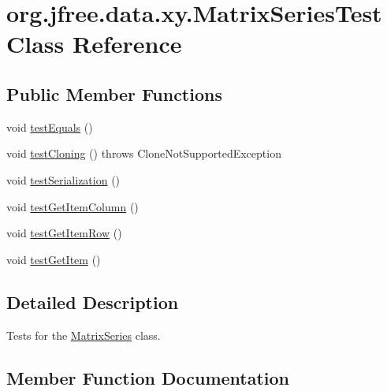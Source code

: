 \hypertarget{classorg_1_1jfree_1_1data_1_1xy_1_1_matrix_series_test}{}\section{org.\+jfree.\+data.\+xy.\+Matrix\+Series\+Test Class Reference}
\label{classorg_1_1jfree_1_1data_1_1xy_1_1_matrix_series_test}
\subsection*{Public Member Functions}
\begin{DoxyCompactItemize}
\item 
void \mbox{\hyperlink{classorg_1_1jfree_1_1data_1_1xy_1_1_matrix_series_test_a9d9396f222c5e63e28dbf255398807f0}{test\+Equals}} ()
\item 
void \mbox{\hyperlink{classorg_1_1jfree_1_1data_1_1xy_1_1_matrix_series_test_a5b12ae9f052f479413f4bfb4c7a5ea72}{test\+Cloning}} ()  throws Clone\+Not\+Supported\+Exception 
\item 
void \mbox{\hyperlink{classorg_1_1jfree_1_1data_1_1xy_1_1_matrix_series_test_ae1d387869dd899462b23f271ff5e872a}{test\+Serialization}} ()
\item 
void \mbox{\hyperlink{classorg_1_1jfree_1_1data_1_1xy_1_1_matrix_series_test_adf61cacbe1302735c11c861c4139b461}{test\+Get\+Item\+Column}} ()
\item 
void \mbox{\hyperlink{classorg_1_1jfree_1_1data_1_1xy_1_1_matrix_series_test_ada6254eb00adb4242f72cb6fe93fed9b}{test\+Get\+Item\+Row}} ()
\item 
void \mbox{\hyperlink{classorg_1_1jfree_1_1data_1_1xy_1_1_matrix_series_test_a981a59a863d5cc11c7c5d6e30e1819cc}{test\+Get\+Item}} ()
\end{DoxyCompactItemize}


\subsection{Detailed Description}
Tests for the \mbox{\hyperlink{classorg_1_1jfree_1_1data_1_1xy_1_1_matrix_series}{Matrix\+Series}} class. 

\subsection{Member Function Documentation}
\mbox{\label{classorg_1_1jfree_1_1data_1_1xy_1_1_matrix_series_test_a5b12ae9f052f479413f4bfb4c7a5ea72}} 
